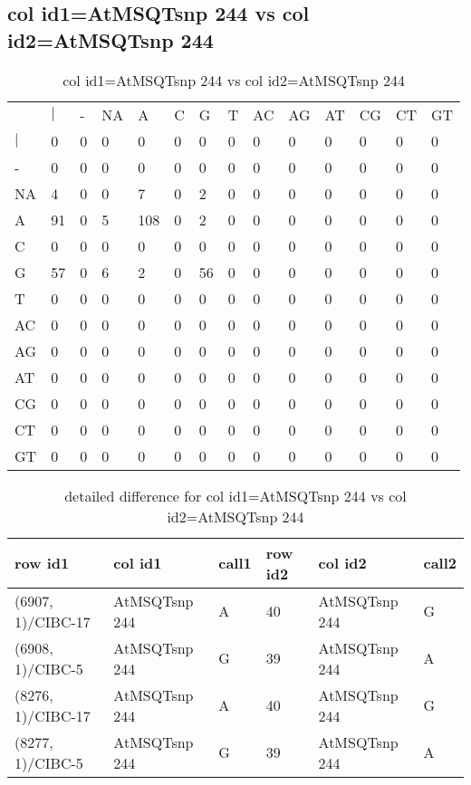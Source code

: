 \subsection{col id1=AtMSQTsnp 244 vs col id2=AtMSQTsnp 244}
\begin{center}
\begin{longtable}{|l|l|l|l|l|l|l|l|l|l|l|l|l|l|}
\caption{col id1=AtMSQTsnp 244 vs col id2=AtMSQTsnp 244} \label{table_dm794}\\
\hline
\\
\hline
&$|$&-&NA&A&C&G&T&AC&AG&AT&CG&CT&GT\\
$|$&0&0&0&0&0&0&0&0&0&0&0&0&0\\
-&0&0&0&0&0&0&0&0&0&0&0&0&0\\
NA&4&0&0&7&0&2&0&0&0&0&0&0&0\\
A&91&0&5&108&0&2&0&0&0&0&0&0&0\\
C&0&0&0&0&0&0&0&0&0&0&0&0&0\\
G&57&0&6&2&0&56&0&0&0&0&0&0&0\\
T&0&0&0&0&0&0&0&0&0&0&0&0&0\\
AC&0&0&0&0&0&0&0&0&0&0&0&0&0\\
AG&0&0&0&0&0&0&0&0&0&0&0&0&0\\
AT&0&0&0&0&0&0&0&0&0&0&0&0&0\\
CG&0&0&0&0&0&0&0&0&0&0&0&0&0\\
CT&0&0&0&0&0&0&0&0&0&0&0&0&0\\
GT&0&0&0&0&0&0&0&0&0&0&0&0&0\\
\hline
\end{longtable}
\end{center}

\begin{center}
\begin{longtable}{|l|l|l|l|l|l|}
\caption{detailed difference for col id1=AtMSQTsnp 244 vs col id2=AtMSQTsnp 244} \label{table_dm795}\\
\hline
row id1&col id1&call1&row id2&col id2&call2\\
\hline
(6907, 1)/CIBC-17&AtMSQTsnp 244&A&40&AtMSQTsnp 244&G\\
(6908, 1)/CIBC-5&AtMSQTsnp 244&G&39&AtMSQTsnp 244&A\\
(8276, 1)/CIBC-17&AtMSQTsnp 244&A&40&AtMSQTsnp 244&G\\
(8277, 1)/CIBC-5&AtMSQTsnp 244&G&39&AtMSQTsnp 244&A\\
\hline
\end{longtable}
\end{center}

